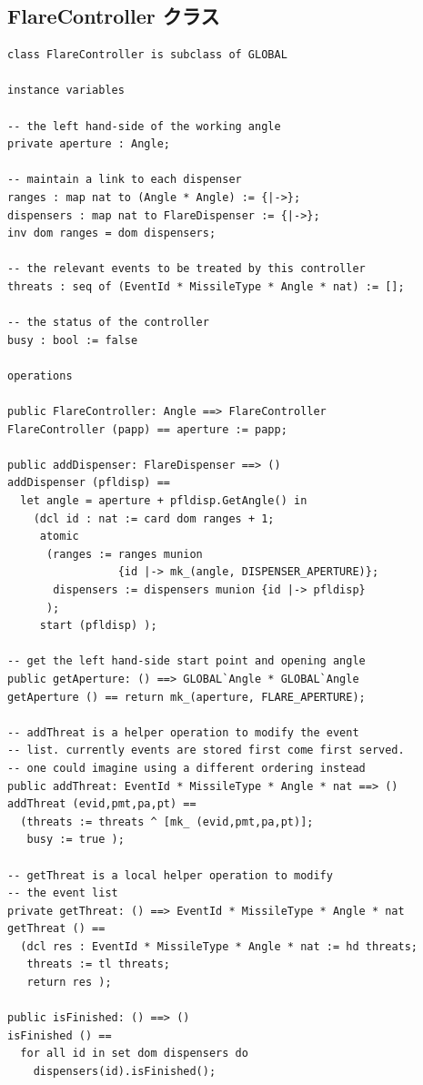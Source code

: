 \documentclass[\pformat,12pt]{jreport}
\begin{document}
\subsection{FlareController クラス}

\begin{lstlisting}
class FlareController is subclass of GLOBAL

instance variables

-- the left hand-side of the working angle
private aperture : Angle;

-- maintain a link to each dispenser
ranges : map nat to (Angle * Angle) := {|->};
dispensers : map nat to FlareDispenser := {|->};
inv dom ranges = dom dispensers;

-- the relevant events to be treated by this controller
threats : seq of (EventId * MissileType * Angle * nat) := [];

-- the status of the controller
busy : bool := false

operations

public FlareController: Angle ==> FlareController
FlareController (papp) == aperture := papp;

public addDispenser: FlareDispenser ==> ()
addDispenser (pfldisp) ==
  let angle = aperture + pfldisp.GetAngle() in
    (dcl id : nat := card dom ranges + 1;
     atomic
      (ranges := ranges munion 
                 {id |-> mk_(angle, DISPENSER_APERTURE)};
       dispensers := dispensers munion {id |-> pfldisp}
      );
     start (pfldisp) );

-- get the left hand-side start point and opening angle
public getAperture: () ==> GLOBAL`Angle * GLOBAL`Angle
getAperture () == return mk_(aperture, FLARE_APERTURE);

-- addThreat is a helper operation to modify the event
-- list. currently events are stored first come first served.
-- one could imagine using a different ordering instead
public addThreat: EventId * MissileType * Angle * nat ==> ()
addThreat (evid,pmt,pa,pt) ==
  (threats := threats ^ [mk_ (evid,pmt,pa,pt)];
   busy := true );

-- getThreat is a local helper operation to modify 
-- the event list
private getThreat: () ==> EventId * MissileType * Angle * nat
getThreat () ==
  (dcl res : EventId * MissileType * Angle * nat := hd threats;
   threats := tl threats;
   return res );

public isFinished: () ==> ()
isFinished () ==
  for all id in set dom dispensers do
    dispensers(id).isFinished();


\end{lstlisting}
\end{document}
